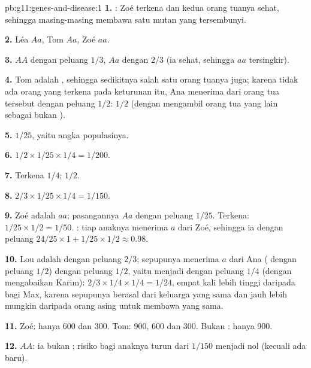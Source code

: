 \begin{solution}{pb:g11:genes-and-disease:1}
\textbf{1.} : Zoé terkena dan kedua orang tuanya sehat,
sehingga masing-masing membawa satu  mutan yang tersembunyi.

\textbf{2.} Léa $Aa$, Tom $Aa$, Zoé $aa$.

\textbf{3.} $AA$ dengan peluang $1/3$, $Aa$ dengan $2/3$ (ia sehat,
sehingga $aa$ tersingkir).

\textbf{4.} Tom adalah , sehingga sedikitnya salah satu orang
tuanya juga; karena tidak ada orang yang terkena pada keturunan itu,
Ana menerima  dari orang tua tersebut dengan peluang $1/2$:
$1/2$ (dengan mengambil orang tua yang lain sebagai bukan ).

\textbf{5.} $1/25$, yaitu angka populasinya.

\textbf{6.} $1/2 \times 1/25 \times 1/4 = 1/200$.

\textbf{7.} Terkena $1/4$;  $1/2$.

\textbf{8.} $2/3 \times 1/25 \times 1/4 = 1/150$.

\textbf{9.} Zoé adalah $aa$; pasangannya $Aa$ dengan peluang $1/25$.
Terkena: $1/25 \times 1/2 = 1/50$. : tiap anaknya menerima $a$
dari Zoé, sehingga ia  dengan peluang $24/25 \times 1 + 1/25 \times
1/2 \approx 0.98$.

\textbf{10.} Lou adalah  dengan peluang $2/3$; sepupunya
menerima $a$ dari Ana ( dengan peluang $1/2$) dengan peluang
$1/2$, yaitu menjadi  dengan peluang $1/4$ (dengan mengabaikan
Karim): $2/3 \times 1/4
\times 1/4 = 1/24$, empat kali lebih tinggi
daripada bagi Max, karena sepupunya berasal dari keluarga yang sama dan
jauh lebih mungkin daripada orang asing untuk membawa  yang sama.

\textbf{11.} Zoé: hanya 600 dan 300. Tom: 900, 600 dan 300. Bukan
: hanya 900.

\textbf{12.} $AA$: ia bukan ; risiko bagi anaknya turun dari
$1/150$ menjadi nol (kecuali ada  baru).


\end{solution}
